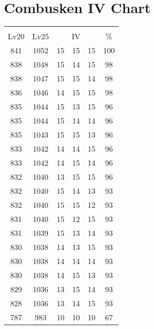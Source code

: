 \documentclass{article}%
\begin{document}
%
\normalsize%
\section{Combusken IV Chart}%
\label{sec:Combusken IV Chart}%
\renewcommand{\arraystretch}{1.5}%
\begin{tabular}{|c|c|c|c|c|c|}%
\hline%
\multicolumn{6}{|c|}{\textcolor{white}{ 
\linebreak{Combusken}
}%
\cellcolor{black}}\\%
\multicolumn{1}{|c}{Lv20}&\multicolumn{1}{c|}{Lv25}&\multicolumn{3}{c|}{IV}&\multicolumn{1}{|c|}{\%}\\%
\hline%
\rowcolor{color100}%
841&1052&15&15&15&100\\%
\hline%
\rowcolor{color98}%
838&1048&15&14&15&98\\%
\hline%
\rowcolor{color98}%
838&1047&15&15&14&98\\%
\hline%
\rowcolor{color98}%
836&1046&14&15&15&98\\%
\hline%
\rowcolor{color96}%
835&1044&15&13&15&96\\%
\hline%
\rowcolor{color96}%
835&1044&15&14&14&96\\%
\hline%
\rowcolor{color96}%
835&1043&15&15&13&96\\%
\hline%
\rowcolor{color96}%
833&1042&14&14&15&96\\%
\hline%
\rowcolor{color96}%
833&1042&14&15&14&96\\%
\hline%
\rowcolor{color96}%
832&1040&13&15&15&96\\%
\hline%
\rowcolor{color93}%
832&1040&15&14&13&93\\%
\hline%
\rowcolor{color93}%
832&1040&15&15&12&93\\%
\hline%
\rowcolor{color93}%
831&1040&15&12&15&93\\%
\hline%
\rowcolor{color93}%
831&1039&15&13&14&93\\%
\hline%
\rowcolor{color93}%
830&1038&14&13&15&93\\%
\hline%
\rowcolor{color93}%
830&1038&14&14&14&93\\%
\hline%
\rowcolor{color93}%
830&1038&14&15&13&93\\%
\hline%
\rowcolor{color93}%
829&1036&13&15&14&93\\%
\hline%
\rowcolor{color93}%
828&1036&13&14&15&93\\%
\hline%
\rowcolor{color91}%
787&983&10&10&10&67\\%
\end{tabular}

%
\end{document}
